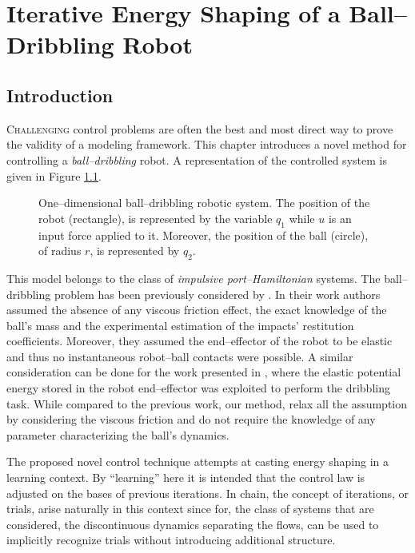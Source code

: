 %
\chapter{Iterative Energy Shaping of a Ball--Dribbling Robot}

\label{chap:balldribbling}
\minitoc

\thispagestyle{empty}

\newpage
\section{Introduction}
%
\lettrine[lines=4]{\color{brickred}C}{hallenging} control problems are often the best and most direct way to prove the validity of a modeling framework. This chapter introduces a novel method for controlling a \textit{ball--dribbling} robot.
A representation of the controlled system is given in Figure \ref{fig:bdcatchy}.
%
\begin{figure}[!ht]
	\centering
	
	\caption[One--dimensional ball--dribbling robotic system.]{One--dimensional ball--dribbling robotic system. The position of the robot (rectangle), is represented by the variable $q_1$ while $u$ is an input force applied to it. Moreover, the position of the ball (circle), of radius $r$, is represented by $q_2$. }
	\label{fig:bdcatchy}
\end{figure}
%

This model belongs to the class of \textit{impulsive port--Hamiltonian} systems. The ball--dribbling problem has been previously considered by \cite{Batz2010}. In their work authors assumed the absence of any viscous friction effect, the exact knowledge of the ball's mass and the experimental estimation of the impacts' restitution coefficients. Moreover, they assumed the end--effector of the robot to be elastic and thus no instantaneous robot--ball contacts were possible. A similar consideration can be done for the work presented in  \citep{haddadin2018exploiting}, where the elastic potential energy stored in the robot end--effector was exploited to perform the dribbling task. While compared to the previous work, our method, relax all the assumption by considering the viscous friction and do not require the knowledge of any parameter characterizing the ball's dynamics.

The proposed novel control technique attempts at casting energy shaping in a learning context. By ``learning'' here it is intended that the control law is adjusted on the bases of previous iterations. In chain, the concept of iterations, or trials, arise naturally in this context since for, the class of systems that are considered, the discontinuous dynamics separating the flows, can be used to implicitly recognize trials without introducing additional structure.


